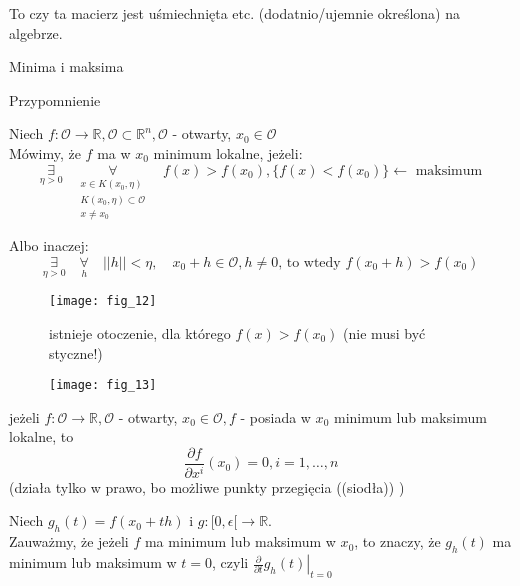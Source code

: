 \documentclass[../main.tex]{subfiles}
\begin{document}
To czy ta macierz jest uśmiechnięta etc. (dodatnio/ujemnie określona) na algebrze.

\begin{large}
    Minima i maksima
\end{large}


\begin{large}
Przypomnienie
\end{large}
Niech $f: \mathcal{O}\to \mathbb{R}, \mathcal{O}\subset \mathbb{R}^n, \mathcal{O}$ - otwarty, $x_0 \in \mathcal{O}$\\
Mówimy, że $f$ ma w $x_0$ minimum lokalne, jeżeli:
$$\underset{\eta > 0}{\exists} \quad
\underset{\substack{
x\in K(x_0,\eta)\\
K(x_0,\eta) \subset \mathcal{O}\\
x \neq x_0
}}{\forall} \quad f(x) > f(x_0), \{f(x) < f(x_0)\} \leftarrow \text { maksimum}$$

Albo inaczej:
$$\underset{\eta > 0}{\exists} \quad\underset{h}{\forall}\quad ||h|| < \eta, \quad x_0+h \in \mathcal{O}, h \neq 0\text{, to wtedy } f(x_0+h)>f(x_0)$$

\begin{figure}[h]
    \centering
    \texttt{[image: fig\_12]}
    \caption{istnieje otoczenie, dla którego  $f(x)>f(x_0)$ (nie musi być styczne!)}
\end{figure}

\begin{figure}[h]
    \centering
    \texttt{[image: fig\_13]}
    \caption{}
    \label{fig:}
\end{figure}

\begin{stw}
jeżeli $f: \mathcal{O} \rightarrow \mathbb{R}, \mathcal{O}$ - otwarty, $x_0 \in \mathcal{O}, f$ - posiada w $x_0$ minimum lub maksimum lokalne, to $$\frac{\partial f}{\partial x^i} (x_0) = 0, i = 1,\dots,n$$
(działa tylko w prawo, bo możliwe punkty przegięcia ((siodła)) )
\end{stw}

\vspace{1cm}
\begin{dowod}

\end{dowod}
Niech $g_h (t) = f(x_0+th) \text{ i } g: [0,\epsilon [ \to \mathbb{R}$.\\
Zauważmy, że jeżeli $f$ ma minimum lub maksimum w $x_0$, to znaczy, że $g_h (t)$ ma minimum lub maksimum w $t = 0$, czyli $\left . \frac{\partial}{\partial t} g_h(t) \right |_{t=0}$
\end{document}
